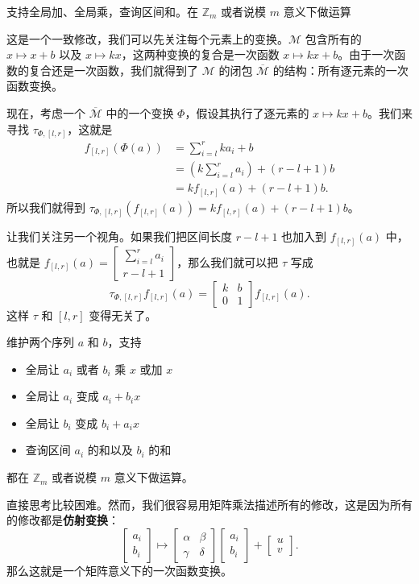 \begin{example}[线段树 2]
    支持全局加、全局乘，查询区间和。在 $\mathbb Z_{m}$ 或者说模 $m$ 意义下做运算
\end{example}
\begin{solution}
    这是一个一致修改，我们可以先关注每个元素上的变换。$\mathcal M$ 包含所有的 $x\mapsto x+b$ 以及 $x\mapsto kx$，这两种变换的复合是一次函数 $x\mapsto kx+b$。由于一次函数的复合还是一次函数，我们就得到了 $\mathcal M$ 的闭包 $\overline{\mathcal M}$ 的结构：所有逐元素的一次函数变换。

    现在，考虑一个 $\overline{\mathcal M}$ 中的一个变换 $\Phi$，假设其执行了逐元素的 $x\mapsto kx+b$。我们来寻找 $\tau_{\Phi,[l,r]}$，这就是
    $$
    \begin{aligned}
    f_{[l,r]}(\Phi(a))&=\sum_{i=l}^r ka_i+b\\
    &=\left(k\sum_{i=l}^r a_i\right)+(r-l+1)b\\
    &=kf_{[l,r]}(a)+(r-l+1)b.
    \end{aligned}
    $$
    所以我们就得到 $\tau_{\Phi,[l,r]}(f_{[l,r]}(a))=kf_{[l,r]}(a)+(r-l+1)b$。

    让我们关注另一个视角。如果我们把区间长度 $r-l+1$ 也加入到 $f_{[l,r]}(a)$ 中，也就是 $f_{[l,r]}(a)=\begin{bmatrix}\sum_{i=l}^r a_i\\ r-l+1\end{bmatrix}$，那么我们就可以把 $\tau$ 写成
    $$
\tau_{\Phi,[l,r]}f_{[l,r]}(a)=\begin{bmatrix}k&b\\0&1\end{bmatrix}f_{[l,r]}(a).
    $$
    这样 $\tau$ 和 $[l,r]$ 变得无关了。
\end{solution}
\begin{example}
    维护两个序列 $a$ 和 $b$，支持
    \begin{itemize}
        \item 全局让 $a_i$ 或者 $b_i$ 乘 $x$ 或加 $x$
        \item 全局让 $a_i$ 变成 $a_i+b_ix$
        \item 全局让 $b_i$ 变成 $b_i+a_ix$
        \item 查询区间 $a_i$ 的和以及 $b_i$ 的和
    \end{itemize}
    都在 $\mathbb Z_m$ 或者说模 $m$ 意义下做运算。
\end{example}
\begin{solution}
    直接思考比较困难。然而，我们很容易用矩阵乘法描述所有的修改，这是因为所有的修改都是\textbf{仿射变换}：
    $$
    \begin{bmatrix}a_i\\b_i\end{bmatrix}\mapsto \begin{bmatrix}\alpha&\beta\\\gamma&\delta\end{bmatrix}\begin{bmatrix}a_i\\b_i\end{bmatrix}+\begin{bmatrix}u\\v\end{bmatrix}.
    $$
    那么这就是一个矩阵意义下的一次函数变换。
\end{solution}
